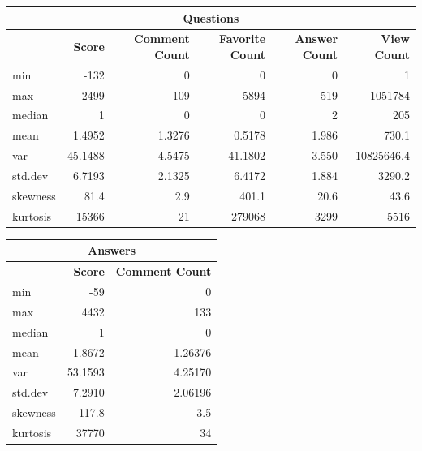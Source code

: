 \documentclass{article}
\begin{document}
\begin{tabular}[t]{| l | r |r|r|r|r|} \hline
\multicolumn{6}{|c|}{Questions} \\ \hline
& \bf{Score} & \bf{Comment Count} & \bf{Favorite Count} & \bf{Answer Count} & \bf{View Count} \\ \hline
min  &           -132 &       0 &        0 &       0 &        1 \\ \hline
max  &           2499 &     109 &     5894 &     519 &  1051784 \\ \hline
median &            1 &       0 &        0 &       2 &      205 \\ \hline
mean  &             1.4952 &       1.3276 &        0.5178 &       1.986 &      730.1 \\ \hline
var   &            45.1488 &       4.5475 &       41.1802 &       3.550 & 10825646.4 \\ \hline
std.dev  &          6.7193 &       2.1325 &        6.4172 &       1.884 &     3290.2 \\ \hline
skewness & 81.4  &          2.9  &        401.1  &         20.6  &         43.6  \\ \hline
kurtosis & 15366   &          21  &       279068   &        3299    &       5516 \\ \hline
\end{tabular}

\vspace{\baselineskip}

\begin{tabular}[t]{| l | r |r|} \hline
\multicolumn{3}{|c|}{Answers} \\ \hline
& \bf{Score} & \bf{Comment Count} \\ \hline 
min & -59    &   0 \\ \hline
max      &        4432  &   133 \\ \hline
median      &        1  &     0 \\ \hline
mean          &      1.8672   &    1.26376 \\ \hline
var        &        53.1593   &    4.25170 \\ \hline
std.dev      &       7.2910   &    2.06196 \\ \hline
skewness & 117.8    &       3.5  \\ \hline
kurtosis & 37770     &       34  \\ \hline
\end{tabular}

\vspace{\baselineskip}
\end{document}
